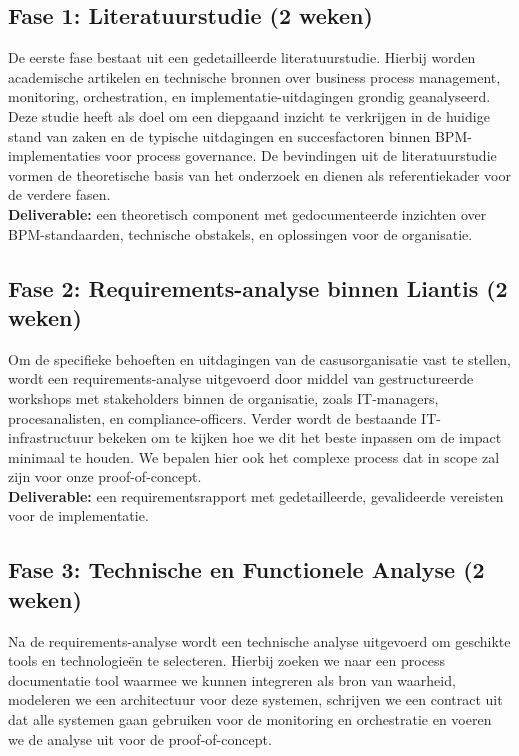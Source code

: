 \subsection{Fase 1: Literatuurstudie (2 weken)}

De eerste fase bestaat uit een gedetailleerde literatuurstudie. Hierbij worden academische artikelen en technische bronnen over business process management, monitoring, orchestration, en implementatie-uitdagingen grondig geanalyseerd. Deze studie heeft als doel om een diepgaand inzicht te verkrijgen in de huidige stand van zaken en de typische uitdagingen en succesfactoren binnen BPM-implementaties voor process governance. De bevindingen uit de literatuurstudie vormen de theoretische basis van het onderzoek en dienen als referentiekader voor de verdere fasen. \\

\textbf{Deliverable:} een theoretisch component met gedocumenteerde inzichten over BPM-standaarden, technische obstakels, en oplossingen voor de organisatie.

\subsection{Fase 2: Requirements-analyse binnen Liantis (2 weken)}

Om de specifieke behoeften en uitdagingen van de casusorganisatie vast te stellen, wordt een requirements-analyse uitgevoerd door middel van gestructureerde workshops met stakeholders binnen de organisatie, zoals IT-managers, procesanalisten, en compliance-officers. Verder wordt de bestaande IT-infrastructuur bekeken om te kijken hoe we dit het beste inpassen om de impact minimaal te houden. We bepalen hier ook het complexe process dat in scope zal zijn voor onze proof-of-concept. \\

\textbf{Deliverable:} een requirementsrapport met gedetailleerde, gevalideerde vereisten voor de implementatie.

\subsection{Fase 3: Technische en Functionele Analyse (2 weken)}

Na de requirements-analyse wordt een technische analyse uitgevoerd om geschikte tools en technologieën te selecteren. Hierbij zoeken we naar een process documentatie tool waarmee we kunnen integreren als bron van waarheid, modeleren we een architectuur voor deze systemen, schrijven we een contract uit dat alle systemen gaan gebruiken voor de monitoring en orchestratie en voeren we de analyse uit voor de proof-of-concept.  \\

